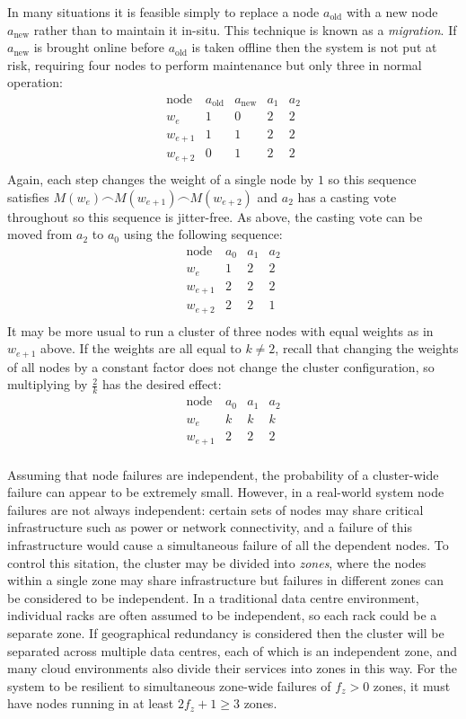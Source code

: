 \documentclass[journal]{IEEEtran}
\begin{document}
In many situations it is feasible simply to replace a node $a_{\textrm{old}}$
with a new node $a_{\textrm{new}}$ rather than to maintain it in-situ. This
technique is known as a \textit{migration}.  If $a_{\textrm{new}}$ is brought
online before $a_{\textrm{old}}$ is taken offline then the system is not put at
risk, requiring four nodes to perform maintenance but only three in normal
operation:
\[\begin{array}{rcccc}
\textrm{node}&a_{\textrm{old}}&a_{\textrm{new}}&a_1&a_2 \\
w_e&1&0&2&2\\
w_{e+1}&1&1&2&2\\
w_{e+2}&0&1&2&2\\
\end{array}\]
Again, each step changes the weight of a single node by $1$ so this sequence
satisfies $M(w_e) \frown M(w_{e+1}) \frown M(w_{e+2})$ and $a_2$ has a casting
vote throughout so this sequence is jitter-free. As above, the casting vote can
be moved from $a_2$ to $a_0$ using the following sequence:
\[\begin{array}{rcccc}
\textrm{node}&a_0&a_1&a_2 \\
w_e&1&2&2\\
w_{e+1}&2&2&2\\
w_{e+2}&2&2&1\\
\end{array}\]
It may be more usual to run a cluster of three nodes with equal weights as in
$w_{e+1}$ above. If the weights are all equal to $k \ne 2$, recall that
changing the weights of all nodes by a constant factor does not change the
cluster configuration, so multiplying by $\frac{2}{k}$ has the desired effect:
\[\begin{array}{rcccc}
\textrm{node}&a_0&a_1&a_2 \\
w_e&k&k&k\\
w_{e+1}&2&2&2\\
\end{array}\]

Assuming that node failures are independent, the probability of a cluster-wide
failure can appear to be extremely small. However, in a real-world system node
failures are not always independent: certain sets of nodes may share critical
infrastructure such as power or network connectivity, and a failure of this
infrastructure would cause a simultaneous failure of all the dependent nodes.
To control this sitation, the cluster may be divided into \textit{zones}, where
the nodes within a single zone may share infrastructure but failures in
different zones can be considered to be independent. In a traditional data
centre environment, individual racks are often assumed to be independent, so
each rack could be a separate zone. If geographical redundancy is considered
then the cluster will be separated across multiple data centres, each of which
is an independent zone, and many cloud environments also divide their services
into zones in this way.  For the system to be resilient to simultaneous
zone-wide failures of $f_z > 0$ zones, it must have nodes running in at least
$2f_z + 1 \ge 3$ zones.
\end{document}
